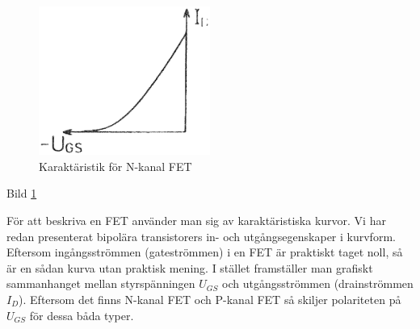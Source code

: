 \begin{figure}
\includegraphics[width=0.5\textwidth]{images/cropped_pdfs/bild_2_2-23.pdf}
\caption{Karaktäristik för N-kanal FET}
\label{fig:BildII2-23}
\end{figure}

Bild \ref{fig:BildII2-23}

För att beskriva en FET använder man sig av karaktäristiska kurvor. Vi har redan
presenterat bipolära transistorers in- och utgångsegenskaper i kurvform.
Eftersom ingångsströmmen (gateströmmen) i en FET är praktiskt taget noll, så är
en sådan kurva utan praktisk mening. I stället framställer man grafiskt
sammanhanget mellan styrspänningen \(U_{GS}\) och utgångsströmmen (drainströmmen
\(I_D\)). Eftersom det finns N-kanal FET och P-kanal FET så skiljer polariteten
på \(U_{GS}\) för dessa båda typer.
